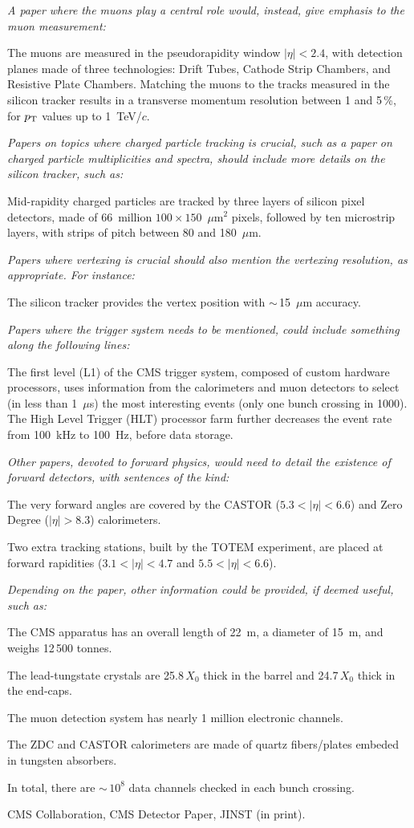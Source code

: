 \documentclass[12pt]{article}
\begin{document}
\emph{A paper where the muons play a central role would, instead, give
  emphasis to the muon measurement:}

The muons are measured in the pseudorapidity window $|\eta|< 2.4$,
with detection planes made of three technologies: Drift Tubes, Cathode
Strip Chambers, and Resistive Plate Chambers.  Matching the muons to
the tracks measured in the silicon tracker results in a transverse
momentum resolution between 1 and 5\,\%, for $p_{\rm T}$ values up to
1~TeV/$c$.

\emph{Papers on topics where charged particle tracking is crucial,
  such as a paper on charged particle multiplicities and spectra,
  should include more details on the silicon tracker, such as:}

Mid-rapidity charged particles are tracked by three layers of silicon
pixel detectors, made of 66~million $100\times150$~$\mu$m$^2$ pixels,
followed by ten microstrip layers, with strips of pitch between 80 and
180~$\mu$m.

\emph{Papers where vertexing is crucial should also mention the
  vertexing resolution, as appropriate.  For instance:}

The silicon tracker provides the vertex position with
$\sim$\,15~$\mu$m accuracy.

\emph{Papers where the trigger system needs to be mentioned, could
  include something along the following lines:}

The first level (L1) of the CMS trigger system, composed of custom
hardware processors, uses information from the calorimeters and muon
detectors to select (in less than 1~$\mu$s) the most interesting
events (only one bunch crossing in 1000).  The High Level Trigger
(HLT) processor farm further decreases the event rate from 100~kHz to
100~Hz, before data storage.

\emph{Other papers, devoted to forward physics, would need to detail
  the existence of forward detectors, with sentences of the kind:}

The very forward angles are covered by the CASTOR ($5.3<|\eta|<6.6$)
and Zero Degree ($|\eta|>8.3$) calorimeters.

Two extra tracking stations, built by the TOTEM experiment, are placed
at forward rapidities ($3.1<|\eta|<4.7$ and $5.5<|\eta|<6.6$).

\emph{Depending on the paper, other information could be provided, if
  deemed useful, such as:}

The CMS apparatus has an overall length of 22~m, a diameter of 15~m,
and weighs 12\,500 tonnes.

The lead-tungstate crystals are 25.8\,$X_0$ thick in the barrel
and 24.7\,$X_0$ thick in the end-caps.

The muon detection system has nearly 1 million electronic channels.

The ZDC and CASTOR calorimeters are made of quartz fibers/plates
embeded in tungsten absorbers.

In total, there are $\sim$\,$10^8$ data channels checked in each bunch
crossing.

\begin{thebibliography}{9}
 CMS Collaboration, CMS Detector Paper, JINST (in print).
\end{thebibliography}
\end{document}
